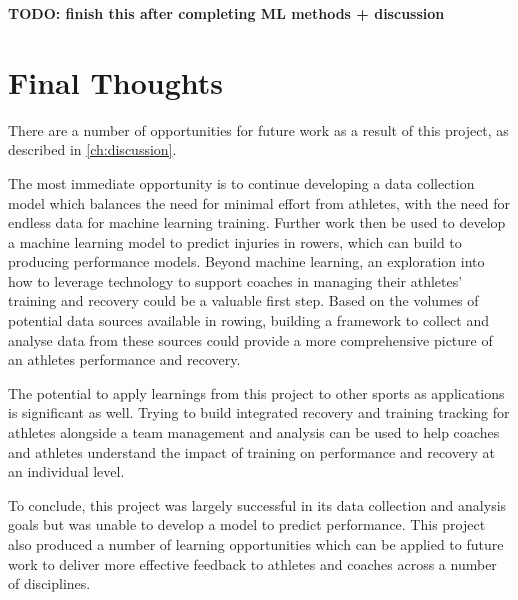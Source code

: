 \textbf{TODO: finish this after completing ML methods + discussion}

\section{Final Thoughts}
There are a number of opportunities for future work as a result of this project, as described in \autoref{ch:discussion}. 

The most immediate opportunity is to continue developing a data collection model which balances the need for minimal effort from athletes, with the need for endless data for machine learning training. Further work then be used to develop a machine learning model to predict injuries in rowers, which can build to producing performance models. Beyond machine learning, an exploration into how to leverage technology to support coaches in managing their athletes' training and recovery could be a valuable first step. Based on the volumes of potential data sources available in rowing, building a framework to collect and analyse data from these sources could provide a more comprehensive picture of an athletes performance and recovery.

The potential to apply learnings from this project to other sports as applications is significant as well. Trying to build integrated recovery and training tracking for athletes alongside a team management and analysis can be used to help coaches and athletes understand the impact of training on performance and recovery at an individual level.

To conclude, this project was largely successful in its data collection and analysis goals but was unable to develop a model to predict performance. This project also produced a number of learning opportunities which can be applied to future work to deliver more effective feedback to athletes and coaches across a number of disciplines.